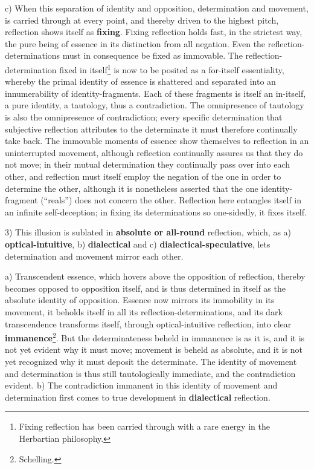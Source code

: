 \documentclass[12pt,a4paper,openany]{book}
\newcommand{\opage}[1]{\marginnote{\footnotesize\textit{[#1]}}}
\begin{document}
c) When this separation of identity and opposition, determination and movement, is carried through at every point, and thereby driven to the highest pitch, reflection shows itself as \textbf{fixing}. Fixing reflection holds fast, in the strictest way, the pure being of essence in its distinction from all negation. Even the reflection-determinations must in consequence be fixed as immovable. The reflection-determination fixed in itself\footnote{Fixing reflection has been carried through with a rare energy in the Herbartian philosophy.}
is now to be posited as a for-itself essentiality, whereby the primal identity of essence is shattered and separated into an innumerability of identity-fragments. Each of these fragments is itself an in-itself, a pure identity, a tautology, thus a contradiction. The omnipresence of tautology is also the omnipresence of contradiction; every specific determination that
\setcounter{footnote}{0}%
\opage{110}subjective reflection attributes to the determinate it must therefore continually take back. The immovable moments of essence show themselves to reflection in an uninterrupted movement, although reflection continually assures us that they do not move; in their mutual determination they continually pass over into each other, and reflection must itself employ the negation of the one in order to determine the other, although it is nonetheless asserted that the one identity-fragment (``reals'')
does not concern the other. Reflection here entangles itself in an infinite self-deception; in fixing its determinations so one-sidedly, it fixes itself.

3) This illusion is sublated in \textbf{absolute or all-round} reflection, which, as a) \textbf{optical-intuitive}, b) \textbf{dialectical} and c) \textbf{dialectical-speculative}, lets determination and movement mirror each other.

a) Transcendent essence, which hovers above the opposition of reflection, thereby becomes opposed to opposition itself, and is thus determined in itself as
the absolute identity of opposition. Essence now mirrors its immobility in its movement, it beholds itself in all its reflection-determinations, and its dark transcendence transforms itself, through optical-intuitive reflection, into clear \textbf{immanence}\footnote{Schelling.}. But the determinateness beheld in immanence is as it is, and it is not yet evident why it must move; movement is beheld as absolute, and it is not yet recognized why it must deposit the determinate. The identity of movement and determination is thus still tautologically immediate, and the contradiction evident.
\setcounter{footnote}{0}%
\opage{111}b) The contradiction immanent in this identity of movement and determination first comes to true development in \textbf{dialectical} reflection.
\end{document}
